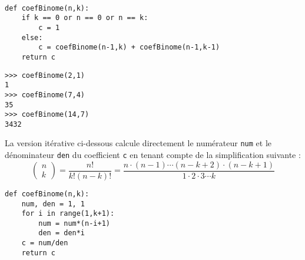 \mbox{}\ \ \begin{py}{8cm}
\begin{verbatim}
def coefBinome(n,k):
    if k == 0 or n == 0 or n == k: 
        c = 1
    else: 
        c = coefBinome(n-1,k) + coefBinome(n-1,k-1)
    return c
\end{verbatim}
\end{py}
\hfill
\begin{py}{5cm}
\begin{verbatim}
>>> coefBinome(2,1)
1
>>> coefBinome(7,4)
35
>>> coefBinome(14,7)
3432
\end{verbatim}
\end{py}
\vspace*{2mm}

\noindent La version itérative ci-dessous calcule directement le
numérateur {\tt num} et le dénominateur {\tt den} du coefficient 
{\tt c} en tenant compte de la simplification suivante :
$$\left(\begin{array}{c}n\\k\end{array}\right) = 
\frac{n!}{k!(n-k)!} = 
\frac{n\cdot(n-1)\cdots(n-k+2)\cdot(n-k+1)}{1\cdot2\cdot3\cdots k}$$

\begin{lstlisting}[caption={\bf Coefficients du binôme},label=cl:binome]
def coefBinome(n,k):
    num, den = 1, 1
    for i in range(1,k+1):
        num = num*(n-i+1)
        den = den*i
    c = num/den
    return c
\end{lstlisting}


